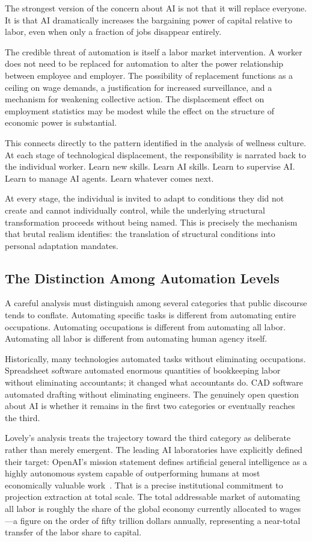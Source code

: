 \documentclass[12pt, a4paper]{article}
\theoremstyle{plain}
\theoremstyle{definition}
\theoremstyle{remark}
\begin{document}
The strongest version of the concern about AI is not that it will replace everyone.
It is that AI dramatically increases the bargaining power of capital relative to labor,
even when only a fraction of jobs disappear entirely.

The credible threat of automation is itself a labor market intervention.
A worker does not need to be replaced for automation to alter the power relationship
between employee and employer.
The possibility of replacement functions as a ceiling on wage demands, a justification
for increased surveillance, and a mechanism for weakening collective action.
The displacement effect on employment statistics may be modest while the effect
on the structure of economic power is substantial.

This connects directly to the pattern identified in the analysis of wellness culture.
At each stage of technological displacement, the responsibility is narrated back
to the individual worker.
Learn new skills.
Learn AI skills.
Learn to supervise AI.
Learn to manage AI agents.
Learn whatever comes next.

At every stage, the individual is invited to adapt to conditions they did not create
and cannot individually control, while the underlying structural transformation
proceeds without being named.
This is precisely the mechanism that brutal realism identifies: the translation of
structural conditions into personal adaptation mandates.

\subsection{The Distinction Among Automation Levels}

A careful analysis must distinguish among several categories that public discourse
tends to conflate.
Automating specific tasks is different from automating entire occupations.
Automating occupations is different from automating all labor.
Automating all labor is different from automating human agency itself.

Historically, many technologies automated tasks without eliminating occupations.
Spreadsheet software automated enormous quantities of bookkeeping labor without
eliminating accountants; it changed what accountants do.
CAD software automated drafting without eliminating engineers.
The genuinely open question about AI is whether it remains in the first two categories
or eventually reaches the third.

Lovely's analysis treats the trajectory toward the third category as deliberate rather
than merely emergent.
The leading AI laboratories have explicitly defined their target: OpenAI's mission
statement defines artificial general intelligence as a highly autonomous system
capable of outperforming humans at most economically valuable work~\cite{novaralively}.
That is a precise institutional commitment to projection extraction at total scale.
The total addressable market of automating all labor is roughly the share of the
global economy currently allocated to wages---a figure on the order of fifty trillion
dollars annually, representing a near-total transfer of the labor share to capital.
\end{document}
